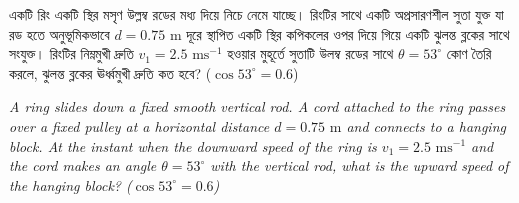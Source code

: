 \documentclass[12pt, a4paper]{article}
\begin{document}
\begin{tcolorbox}[questionbox={প্রশ্ন (Question) 10}]
    \noindent
    একটি রিং একটি স্থির মসৃণ উল্লম্ব রডের মধ্য দিয়ে নিচে নেমে যাচ্ছে। রিংটির সাথে একটি অপ্রসারণশীল সুতা যুক্ত যা রড হতে অনুভূমিকভাবে $d = 0.75\text{ m}$ দূরে স্থাপিত একটি স্থির কপিকলের ওপর দিয়ে গিয়ে একটি ঝুলন্ত ব্লকের সাথে সংযুক্ত। রিংটির নিম্নমুখী দ্রুতি $v_1 = 2.5\text{ ms}^{-1}$ হওয়ার মুহূর্তে সুতাটি উলম্ব রডের সাথে $\theta = 53^\circ$ কোণ তৈরি করলে, ঝুলন্ত ব্লকের ঊর্ধ্বমুখী দ্রুতি কত হবে? ($\cos 53^\circ = 0.6$)
    
    \vspace{0.8em}
    \begin{english}
    \noindent\textit{\color{darkgray}
    A ring slides down a fixed smooth vertical rod. A cord attached to the ring passes over a fixed pulley at a horizontal distance $d = 0.75\text{ m}$ and connects to a hanging block. At the instant when the downward speed of the ring is $v_1 = 2.5\text{ ms}^{-1}$ and the cord makes an angle $\theta = 53^\circ$ with the vertical rod, what is the upward speed of the hanging block? ($\cos 53^\circ = 0.6$)
    }
    \end{english}
\end{tcolorbox}
\end{document}

